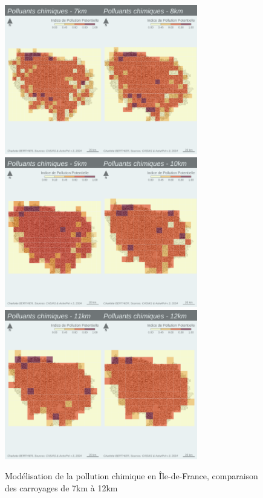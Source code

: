 \documentclass[a4paper,twoside,12pt]{book}
\begin{document}
\clearpage
\begin{figure}[!h] 
\centering  
\includegraphics[width=0.75\textwidth]{img/chapitre4/CARROYAGE_IPP_CHIMIQUE_7KM_8KM.png}
\includegraphics[width=0.75\textwidth]{img/chapitre4/CARROYAGE_IPP_CHIMIQUE_9KM_10KM.png}
\includegraphics[width=0.75\textwidth]{img/chapitre4/CARROYAGE_IPP_CHIMIQUE_11KM_12KM.png} 
\caption{Modélisation de la pollution chimique en Île-de-France, comparaison des carroyages de 7km à 12km} 
\label{fig:carte_carroyages_IPP_Chimique_2}
\end{figure} 
\end{document}
